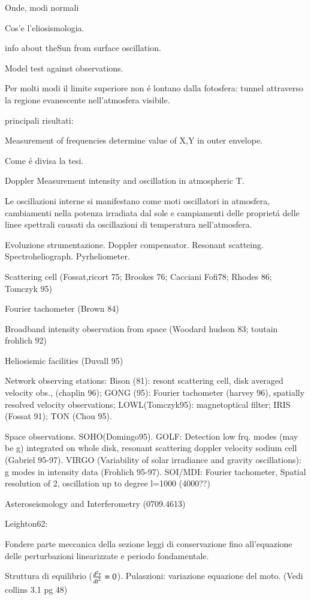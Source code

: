 \documentclass[oneside,12pt,fleqn]{memoir}
\begin{document}
\begin{itemize*}
\item Onde, modi normali
\item Cos'e l'eliosismologia.
\item info about theSun from surface oscillation.
\item Model test against observations.
\item Per molti modi il limite superiore non \'e lontano dalla fotosfera: tunnel attraverso la regione evanescente nell'atmosfera visibile.
\item principali risultati:
    \item Measurement of frequencies determine value of X,Y in outer envelope.
\item Come \'e divisa la tesi.



\item Doppler Measurement intensity and oscillation in atmospheric T.

Le oscillazioni interne si manifestano come moti oscillatori in atmosfera, cambiamenti nella potenza irradiata dal sole e campiamenti delle propriet\'a delle linee spettrali causati da oscillazioni di temperatura nell'atmosfera.
\item Evoluzione strumentazione. Doppler compensator. Resonant scatteing. Spectroheliograph. Pyrheliometer.
\item Scattering cell (Fossat,ricort 75; Brookes 76; Cacciani Fofi78; Rhodes 86; Tomczyk 95)
\item Fourier tachometer (Brown 84)
\item Broadband intensity observation from space (Woodard hudson 83; toutain frohlich 92)
\item Heliosismic facilities (Duvall 95)
\item Network observing stations: Bison (81): resont scattering cell, disk averaged velocity obs., (chaplin 96); GONG (95): Fourier tachometer (harvey 96), spatially resolved velocity observations; LOWL(Tomczyk95): magnetoptical filter; IRIS (Fossat 91); TON (Chou 95).
\item Space observations. SOHO(Domingo95). GOLF: Detection low frq. modes (may be g) integrated on whole disk, resonant scattering doppler velocity sodium cell (Gabriel 95-97). VIRGO (Variability of solar irradiance and gravity oscillations): g modes in intensity data (Frohlich 95-97). SOI/MDI: Fourier tachometer, Spatial resolution of \SI{2}{\arcsec}, oscillation up to degree l=1000 (4000??)
\item  Asteroseismology and Interferometry (0709.4613)
\item Leighton62:
\item Fondere parte meccanica della sezione leggi di conservazione fino all'equazione delle perturbazioni linearizzate e periodo fondamentale.
\item Struttura di equilibrio ($\TtwoDy{t}{r}=0$). Pulaszioni: variazione equazione del moto. (Vedi collins 3.1 pg 48)



\end{itemize*}
\end{document}
